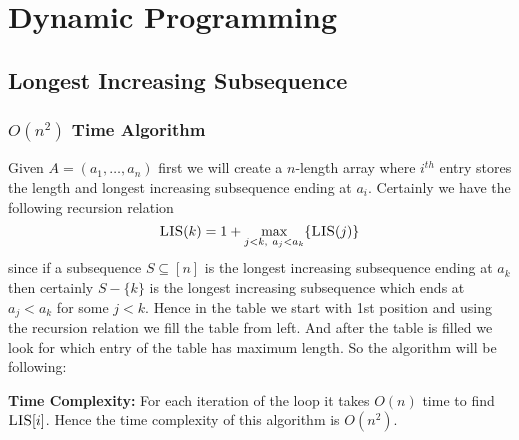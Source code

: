 \chapter{Dynamic Programming}
\section{Longest Increasing Subsequence}
\begin{algoprob}
\end{algoprob}
\subsection{\texorpdfstring{$O(n^2)$}{O(n2)} Time Algorithm}
Given $A=(a_1,\dots, a_n)$ first we will create a $n$-length array where $i^{th}$ entry stores the length and longest increasing subsequence ending at $a_i$. Certainly we have the following recursion relation$$\textsc{LIS}(k)=1+\max\limits_{\substack{j<k,\  a_j<a_k}}\{\textsc{LIS}(j)\}$$since if a subsequence $S\subseteq [n]$ is the longest increasing subsequence ending at $a_k$ then certainly $S-\{k\}$ is the longest increasing subsequence which ends at $a_j<a_k$ for some $j<k$. Hence in the table we start with 1st position and using the recursion relation we fill the table from left. And after the table is filled we look for which entry of the table has maximum length. So the algorithm will be following:

\begin{algorithm}[H]
	\DontPrintSemicolon
\caption{$(A)$}
\end{algorithm}\parinf
\textbf{Time Complexity:} For each iteration of the loop it takes $O(n)$ time to find $\textsc{LIS}[i]$. Hence the time complexity of this algorithm is $O(n^2)$. \parinn
